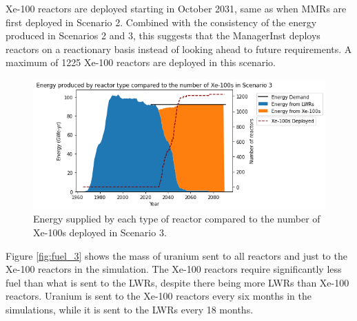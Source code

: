 Xe-100 reactors are deployed starting in October 2031, same as when \glspl{MMR}
are first deployed in Scenario 2. Combined with the consistency of the energy 
produced in Scenarios 2 and 3, this suggests that the \Cycamore ManagerInst 
deploys reactors on a reactionary basis instead of looking ahead to future 
requirements. A maximum of 1225 Xe-100 reactors are deployed in this scenario.

\begin{figure}
    \centering 
    \includegraphics[scale=0.5]{figures/energy_scenario3.png}
    \caption{Energy supplied by each type of reactor compared to the number of 
    Xe-100s deployed in Scenario 3.}
    \label{fig:energy_rx_3}
\end{figure}

Figure \ref{fig:fuel_3} shows the mass of uranium sent to all reactors and 
just to the Xe-100 reactors in the simulation. The Xe-100 reactors 
require significantly less fuel than what is sent to the \glspl{LWR}, 
despite there being more \glspl{LWR} than Xe-100 reactors. Uranium 
is sent to the Xe-100 reactors every six months in the simulations, 
while it is sent to the \glspl{LWR} every 18 months. 

